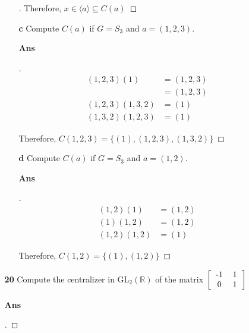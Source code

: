 \documentclass[paper=usletter, fontsize=12pt]{article}
\begin{document}
\begin{itemize}
\begin{itemize}
\begin{enumerate}
\begin{proof}[\unskip\nopunct]
                    Therefore, $x \in \langle a \rangle \subseteq C(a)$
                    \qedhere
                \end{proof}
                \vspace{0.2in}

                \item[\textbf{c}] Compute $C(a)$ if $G=S_3$ and $a = (1,2,3)$.
                \item[\textbf{Ans}]
                \begin{proof}[\unskip\nopunct]

                    \begin{align*}
                        (1,2,3)(1) & = (1,2,3)\\
                        & = (1,2,3)\\
                        (1,2,3)(1,3,2) & = (1)\\
                        (1,3,2)(1,2,3) & = (1)
                    \end{align*}

                    Therefore, $C(1,2,3)=\{(1),(1,2,3),(1,3,2)\}$ \qedhere

                \end{proof}
                \vspace{0.2in}

                \item[\textbf{d}] Compute $C(a)$ if $G=S_3$ and $a = (1,2)$.
                \item[\textbf{Ans}]
                \begin{proof}[\unskip\nopunct]

                    \begin{align*}
                        (1,2)(1) & = (1,2)\\
                        (1)(1,2) & = (1,2)\\
                        (1,2)(1,2) & = (1)
                    \end{align*}

                    Therefore, $C(1,2)=\{(1),(1,2)\}$ \qedhere

                \end{proof}
                \vspace{0.2in}

            \end{enumerate}

            \item[\textbf{20}] Compute the centralizer in $\text{GL}_2(\mathbb{R})$ of the matrix $\left[\begin{tabular}{cc}
                                        -1 & 1 \\
                                        0 & 1
                                    \end{tabular}\right]$
            \item[\textbf{Ans}]
            \begin{proof}[\unskip\nopunct]


\end{proof}
\end{itemize}
\end{itemize}
\end{document}
